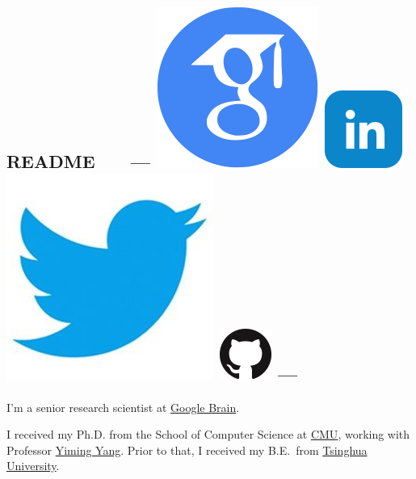 \documentclass{article}
\begin{document}
\subsection*{README \ \ \ --- \protect
\href{https://scholar.google.com/citations?user=IMkVH_8AAAAJ&hl=en}{\includegraphics[natwidth=22, natheight=22]{img/google-scholar.png}}
\href{https://www.linkedin.com/in/hanxiao-liu-17194a4a/}{\includegraphics[natwidth=22, natheight=22]{img/linkedin.png}}
\href{https://twitter.com/Hanxiao_6}{\includegraphics[natwidth=22, natheight=22]{img/twitter.jpg}}
\href{https://github.com/quark0}{\includegraphics[natwidth=22, natheight=22]{img/GitHub-Mark-64px.png}}
---
}
I'm a senior research scientist at \href{https://ai.google/research/teams/brain}{Google Brain}.

\noindent I received my Ph.D. from
the School of Computer Science at
\href{http://www.cmu.edu/index.shtml}{CMU},
working with Professor \href{http://www.cs.cmu.edu/~yiming/publications.html}{Yiming Yang}.
Prior to that,
I received my B.E.\ from
\href{http://www.tsinghua.edu.cn/publish/newthuen/index.html}{Tsinghua University}.
\end{document}

